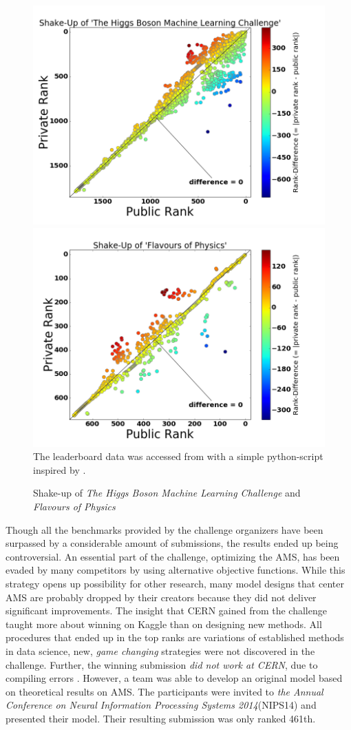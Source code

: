 \begin{figure}
	\includegraphics[width=.5\textwidth]{images/shakeup}
	\includegraphics[width=.5\textwidth]{images/flavshakeup}
	The leaderboard data was accessed from \cite{kaggle} with a simple python-script inspired by \cite{hebert}.
	\caption{Shake-up of \emph{The Higgs Boson Machine Learning Challenge} and \emph{Flavours of Physics}}
	\label{fig:shakeup}
\end{figure}

Though all the benchmarks provided by the challenge organizers have been surpassed by a considerable amount of submissions, the results ended up being controversial. An essential part of the challenge, optimizing the AMS, has been evaded by many competitors by using alternative objective functions. While this strategy opens up possibility for other research, many model designs that center AMS are probably dropped by their creators because they did not deliver significant improvements. 
The insight that CERN gained from the challenge taught more about winning on Kaggle than on designing new methods. All procedures that ended up in the top ranks are variations of established methods in data science, new, \emph{game changing} strategies were not discovered in the challenge. Further, the winning submission \emph{did not work at CERN}, due to compiling errors \cite{keglblog}.
However, a team was able to develop an original model based on theoretical results on AMS\cite{mack14}. The participants were invited to \emph{the Annual Conference on Neural Information Processing Systems 2014}(NIPS14) and presented their model. Their resulting submission was only ranked 461th.

